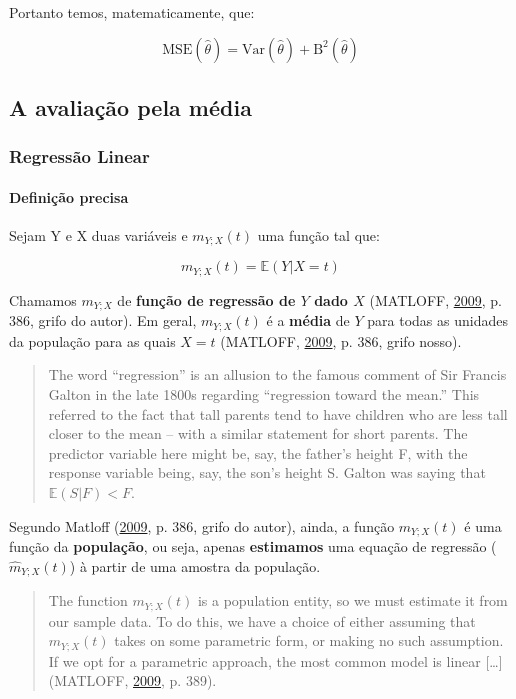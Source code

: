 \documentclass[a4paper, 12pt]{article}
\let\oldparagraph\paragraph
\renewcommand{\paragraph}[1]{\oldparagraph{#1}\mbox{}}
\begin{document}
Portanto temos, matematicamente, que:

\[\text{MSE}(\hat{\theta}) = \text{Var}(\hat{\theta}) + \text{B}^2(\hat{\theta})\]

\subsection{A avaliação pela média}\label{a-avaliacao-pela-media}

\hypertarget{regressao-linear}{\subsubsection{Regressão
Linear}\label{regressao-linear}}

\paragraph{Definição precisa}\label{definicao-precisa}

Sejam Y e X duas variáveis e \(m_{Y;X}(t)\) uma função tal que:

\[m_{Y;X}(t) = \mathbb{E}(Y|X = t)\]

Chamamos \(m_{Y;X}\) de \textbf{função de regressão de \(Y\) dado \(X\)}
(MATLOFF, \protect\hyperlink{ref-matloff2009}{2009}, p. 386, grifo do
autor). Em geral, \(m_{Y;X}(t)\) é a \textbf{média} de \(Y\) para todas
as unidades da população para as quais \(X = t\) (MATLOFF,
\protect\hyperlink{ref-matloff2009}{2009}, p. 386, grifo nosso).

\begin{quote}
The word ``regression'' is an allusion to the famous comment of Sir
Francis Galton in the late 1800s regarding ``regression toward the
mean.'' This referred to the fact that tall parents tend to have
children who are less tall closer to the mean -- with a similar
statement for short parents. The predictor variable here might be, say,
the father's height F, with the response variable being, say, the son's
height S. Galton was saying that \(\mathbb{E}(S|F) < F\).
\end{quote}

Segundo Matloff (\protect\hyperlink{ref-matloff2009}{2009}, p. 386,
grifo do autor), ainda, a função \(m_{Y;X}(t)\) é uma função da
\textbf{população}, ou seja, apenas \textbf{estimamos} uma equação de
regressão (\(\hat{m}_{Y;X}(t)\)) à partir de uma amostra da população.

\begin{quote}
The function \(m_{Y;X}(t)\) is a population entity, so we must estimate
it from our sample data. To do this, we have a choice of either assuming
that \(m_{Y;X}(t)\) takes on some parametric form, or making no such
assumption. If we opt for a parametric approach, the most common model
is linear {[}\ldots{}{]} (MATLOFF,
\protect\hyperlink{ref-matloff2009}{2009}, p. 389).
\end{quote}
\end{document}
